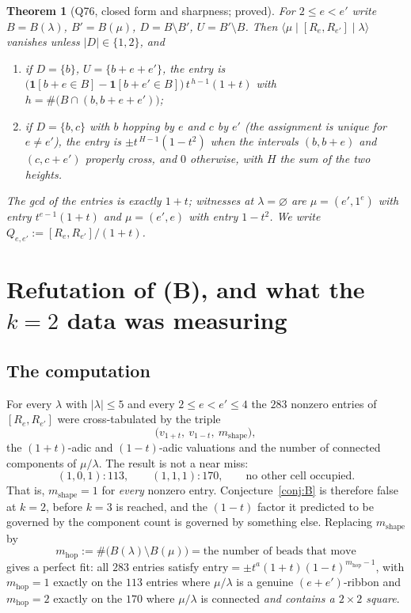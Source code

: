 \documentclass[11pt]{article}
\newtheorem{theorem}{Theorem}
\theoremstyle{definition}
\newcommand{\one}{\mathbf{1}}
\begin{document}
\begin{theorem}[Q76, closed form and sharpness; proved]\label{thm:Q76}
For $2\le e<e'$ write $B=B(\lambda)$, $B'=B(\mu)$, $D=B\setminus B'$, $U=B'\setminus B$. Then
$\langle\mu\mid[R_e,R_{e'}]\mid\lambda\rangle$ vanishes unless $|D|\in\{1,2\}$, and
\begin{enumerate}
\item[(i)] if $D=\{b\}$, $U=\{b+e+e'\}$, the entry is
$\bigl(\one[b+e\in B]-\one[b+e'\in B]\bigr)\,t^{\,h-1}(1+t)$ with
$h=\#\bigl(B\cap(b,b+e+e')\bigr)$;
\item[(ii)] if $D=\{b,c\}$ with $b$ hopping by $e$ and $c$ by $e'$ (the assignment is unique for
$e\ne e'$), the entry is $\pm t^{\,H-1}(1-t^2)$ when the intervals $(b,b+e)$ and $(c,c+e')$
\emph{properly cross}, and $0$ otherwise, with $H$ the sum of the two heights.
\end{enumerate}
The gcd of the entries is exactly $1+t$; witnesses at $\lambda=\varnothing$ are $\mu=(e',1^e)$
with entry $t^{e-1}(1+t)$ and $\mu=(e',e)$ with entry $1-t^2$. We write
$Q_{e,e'}:=[R_e,R_{e'}]/(1+t)$.
\end{theorem}

\section{Refutation of (B), and what the $k=2$ data was measuring}\label{sec:B}

\subsection{The computation}

For every $\lambda$ with $|\lambda|\le5$ and every $2\le e<e'\le4$ the $283$ nonzero entries of
$[R_e,R_{e'}]$ were cross-tabulated by the triple
\[
\bigl(v_{1+t},\ v_{1-t},\ m_{\mathrm{shape}}\bigr),
\]
the $(1+t)$-adic and $(1-t)$-adic valuations and the number of connected components of
$\mu/\lambda$. The result is not a near miss:
\[
(1,0,1)\colon 113,\qquad (1,1,1)\colon 170,\qquad\text{no other cell occupied.}
\]
That is, $m_{\mathrm{shape}}=1$ for \emph{every} nonzero entry. Conjecture~\ref{conj:B} is
therefore false at $k=2$, before $k=3$ is reached, and the $(1-t)$ factor it predicted to be
governed by the component count is governed by something else. Replacing
$m_{\mathrm{shape}}$ by
\[
m_{\mathrm{hop}}:=\#\bigl(B(\lambda)\setminus B(\mu)\bigr) = \text{the number of beads that move}
\]
gives a perfect fit: all $283$ entries satisfy
$\text{entry}=\pm t^a(1+t)(1-t)^{m_{\mathrm{hop}}-1}$, with $m_{\mathrm{hop}}=1$ exactly on the
$113$ entries where $\mu/\lambda$ is a genuine $(e+e')$-ribbon and $m_{\mathrm{hop}}=2$ exactly on
the $170$ where $\mu/\lambda$ is connected \emph{and contains a $2\times2$ square}.
\end{document}
